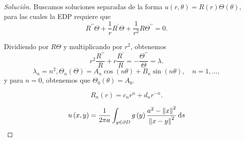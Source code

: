 \documentclass[aspectratio=1610,spanish,8pt]{beamer}
\begin{document}
\begin{frame}
    \frametitle{\secname}

    \begin{proof}[Solución]
        Buscamos soluciones separadas de la forma
        \begin{math}
            u\left(r,\theta\right)=
            R\left(r\right)
            \Theta\left(\theta\right)
        \end{math},
        para las cuales la EDP requiere que
        \begin{equation*}
            R^{\prime\prime}\Theta+
            \frac{1}{r}
            R^{\prime}
            \Theta+
            \frac{1}{r^{2}}
            R\Theta^{\prime\prime}=
            0.
        \end{equation*}

        Dividiendo por $R\Theta$ y multiplicando por $r^{2}$,
        obtenemos
        \begin{equation*}
            r^{2}
            \frac{R^{\prime\prime}}{R}+
            r\frac{R^{\prime}}{R}=
            -\frac{\Theta^{\prime\prime}}{\Theta}=
            \lambda.
        \end{equation*}
        \begin{equation*}
            \lambda_{n}=n^{2},
            \Theta_{n}\left(\Theta\right)=
            A_{n}
            \cos\left(n\theta\right)+
            B_{n}\sin\left(n\theta\right),\quad
            n=1,\dotsc,
        \end{equation*}
        y para $n=0$, obtenemos que $\Theta_{0}\left(\theta\right)=A_{0}$.

        \begin{equation*}
            R_{n}\left(r\right)=
            c_{n}r^{n}+
            d_{n}r^{-n}.
        \end{equation*}

        \begin{equation*}
            u\left(x,y\right)=
            \frac{1}{2\pi a}
            \int_{y\in\partial D}
            g\left(y\right)
            \frac{a^{2}-{\left\|x\right\|}^{2}}{{\left\|x-y\right\|}^{2}}\dl{s}
        \end{equation*}
    \end{proof}
\end{frame}
\end{document}
